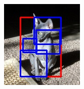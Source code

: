 \documentclass[conference,compsoc]{IEEEtran}
\begin{document}
\begin{figure}
\begin{multicols}{4}
    		\includegraphics[height=1.35\linewidth]{smolrect.jpg}\par

\end{multicols}
\end{figure}
\end{document}
